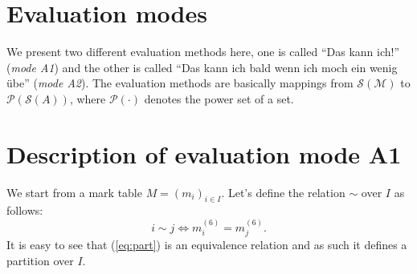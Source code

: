 \documentclass{scrartcl}
\begin{document}
\section{Evaluation modes}
We present two different evaluation methods here, one is called ``Das kann ich!'' (\emph{mode A1}) and the other is called ``Das kann ich bald wenn ich moch ein wenig übe'' (\emph{mode A2}). The evaluation methods are basically mappings from $\mathcal{S}({\mathcal{M}})$ to $\mathcal{P}({\mathcal{S}(A)})$, where $\mathcal{P}(\cdot)$ denotes the power set of a set.

\section{Description of evaluation mode A1}
We start from a mark table $M=(m_i)_{i\in I}$. Let's define the relation $\sim$ over $I$ as follows:
\begin{equation}
i\sim j \Leftrightarrow m_i^{(6)}=m_j^{(6)}.
\label{eq:part}
\end{equation}
It is easy to see that (\ref{eq:part}) is an equivalence relation and as such it defines a partition over $I$.
\end{document}

